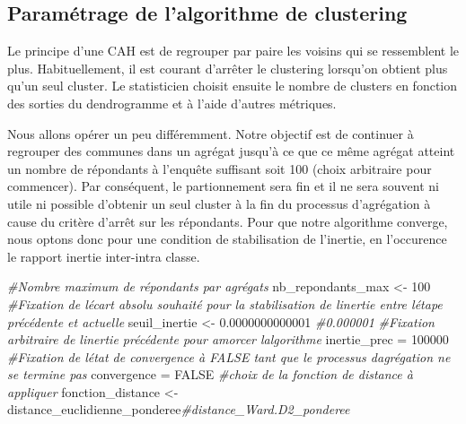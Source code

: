 \documentclass[
]{article}
\newenvironment{Shaded}{\begin{snugshade}}{\end{snugshade}}
\newcommand{\CommentTok}[1]{\textcolor[rgb]{0.56,0.35,0.01}{\textit{#1}}}
\newcommand{\ConstantTok}[1]{\textcolor[rgb]{0.00,0.00,0.00}{#1}}
\newcommand{\DecValTok}[1]{\textcolor[rgb]{0.00,0.00,0.81}{#1}}
\newcommand{\FloatTok}[1]{\textcolor[rgb]{0.00,0.00,0.81}{#1}}
\newcommand{\NormalTok}[1]{#1}
\newcommand{\OtherTok}[1]{\textcolor[rgb]{0.56,0.35,0.01}{#1}}
\begin{document}
\hypertarget{paramuxe9trage-de-lalgorithme-de-clustering}{%
\subsection{Paramétrage de l'algorithme de
clustering}\label{paramuxe9trage-de-lalgorithme-de-clustering}}

Le principe d'une CAH est de regrouper par paire les voisins qui se
ressemblent le plus. Habituellement, il est courant d'arrêter le
clustering lorsqu'on obtient plus qu'un seul cluster. Le statisticien
choisit ensuite le nombre de clusters en fonction des sorties du
dendrogramme et à l'aide d'autres métriques.

Nous allons opérer un peu différemment. Notre objectif est de continuer
à regrouper des communes dans un agrégat jusqu'à ce que ce même agrégat
atteint un nombre de répondants à l'enquête suffisant soit 100 (choix
arbitraire pour commencer). Par conséquent, le partionnement sera fin et
il ne sera souvent ni utile ni possible d'obtenir un seul cluster à la
fin du processus d'agrégation à cause du critère d'arrêt sur les
répondants. Pour que notre algorithme converge, nous optons donc pour
une condition de stabilisation de l'inertie, en l'occurence le rapport
inertie inter-intra classe.

\begin{Shaded}
\begin{Highlighting}[]
\CommentTok{\#Nombre maximum de répondants par agrégats}
\NormalTok{nb\_repondants\_max }\OtherTok{\textless{}{-}} \DecValTok{100}
\CommentTok{\#Fixation de l\textquotesingle{}écart absolu souhaité pour la stabilisation de l\textquotesingle{}inertie entre l\textquotesingle{}étape précédente et actuelle}
\NormalTok{seuil\_inertie }\OtherTok{\textless{}{-}} \FloatTok{0.0000000000001} \CommentTok{\#0.000001}
\CommentTok{\#Fixation arbitraire de l\textquotesingle{}inertie précédente pour amorcer l\textquotesingle{}algorithme}
\NormalTok{inertie\_prec }\OtherTok{=} \DecValTok{100000}
\CommentTok{\#Fixation de l\textquotesingle{}état de convergence à FALSE tant que le processus d\textquotesingle{}agrégation ne se termine pas}
\NormalTok{convergence }\OtherTok{=} \ConstantTok{FALSE}
\CommentTok{\#choix de la fonction de distance à appliquer}
\NormalTok{fonction\_distance }\OtherTok{\textless{}{-}}\NormalTok{ distance\_euclidienne\_ponderee}\CommentTok{\#distance\_Ward.D2\_ponderee}
\end{Highlighting}
\end{Shaded}
\end{document}
